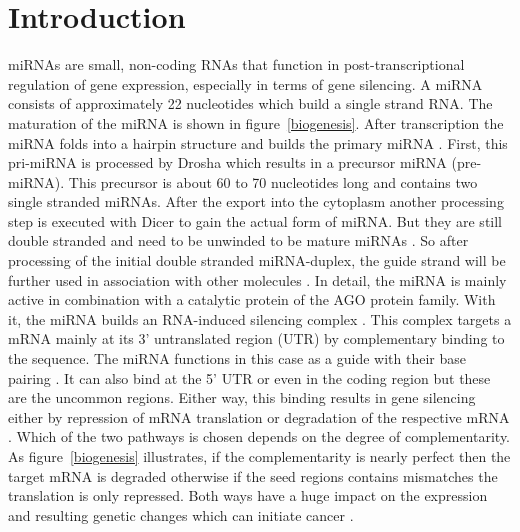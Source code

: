 \documentclass[12pt]{article}
\begin{document}
\tableofcontents

\newpage 
{}






 
\section{Introduction}

miRNAs are small, non-coding RNAs that function in post-transcriptional regulation of gene expression, especially in terms of gene silencing. A miRNA consists of approximately 22 nucleotides which build a single strand RNA. The maturation of the miRNA is shown in figure~\ref{biogenesis}. After transcription the miRNA folds into a hairpin structure and builds the primary miRNA \cite{Macfarlane}. First, this pri-miRNA is processed by Drosha which results in a precursor miRNA (pre-miRNA). This precursor is about 60 to 70 nucleotides long and contains two single stranded miRNAs. After the export into the cytoplasm another processing step is executed with Dicer to gain the actual form of miRNA. But they are still double stranded and need to be unwinded to be mature miRNAs \cite{Macfarlane}. So after processing of the initial double stranded miRNA-duplex, the guide strand will be further used in association with other molecules \cite{Grunz}. In detail, the miRNA is mainly active in combination with a catalytic protein of the AGO protein family. With it, the miRNA builds an RNA-induced silencing complex \cite{Ha}. This complex targets a mRNA mainly at its 3' untranslated region (UTR) by complementary binding to the sequence. The miRNA functions in this case as a guide with their base pairing \cite{Macfarlane}. It can also bind at the 5' UTR or even in the coding region but these are the uncommon regions. Either way, this binding results in gene silencing either by repression of mRNA translation or degradation of the respective mRNA \cite{Enright}. Which of the two pathways is chosen depends on the degree of complementarity. As figure~\ref{biogenesis} illustrates, if the complementarity is nearly perfect then the target mRNA is degraded otherwise if the seed regions contains mismatches the translation is only repressed. Both ways have a huge impact on the expression and resulting genetic changes which can initiate cancer \cite{Macfarlane}.\\
\end{document}
